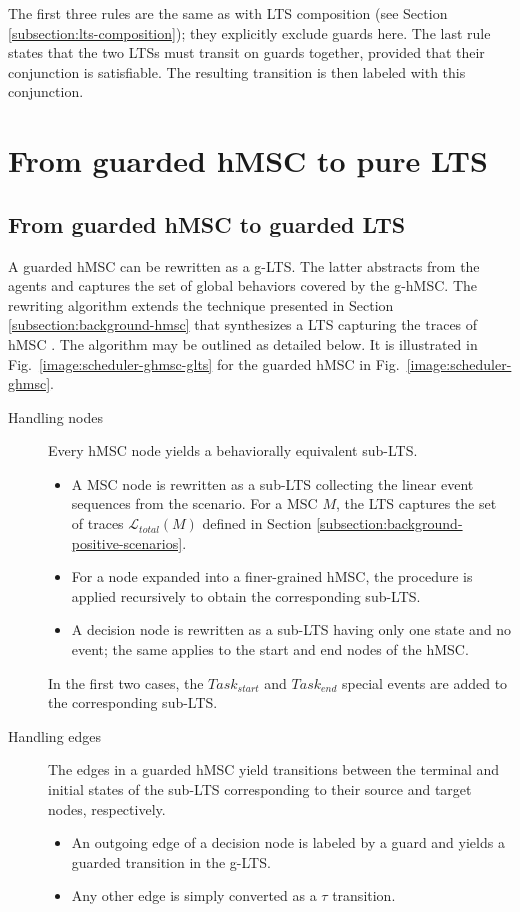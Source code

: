 The first three rules are the same as with LTS composition (see Section \ref{subsection:lts-composition}); they explicitly exclude guards here. The last rule states that the two LTSs must transit on guards together, provided that their conjunction is satisfiable. The resulting transition is then labeled with this conjunction.

\section{From guarded hMSC to pure LTS}

\subsection{From guarded hMSC to guarded LTS}

A guarded hMSC can be rewritten as a g-LTS. The latter abstracts from the agents and captures the set of global behaviors covered by the g-hMSC. The rewriting algorithm extends the technique presented in Section \ref{subsection:background-hmsc} that synthesizes a LTS capturing the traces of hMSC \cite{Uchitel:2004}. The algorithm may
be outlined as detailed below. It is illustrated in Fig.~\ref{image:scheduler-ghmsc-glts} for the guarded hMSC in Fig.~\ref{image:scheduler-ghmsc}.

\begin{description}
\item[Handling nodes] Every hMSC node yields a behaviorally equivalent sub-LTS.
\begin{itemize}
\item A MSC node is rewritten as a sub-LTS collecting the linear event sequences from the scenario. For a MSC $M$, the LTS captures the set of traces $\mathcal{L}_{total}(M)$ defined in Section \ref{subsection:background-positive-scenarios}.
\item For a node expanded into a finer-grained hMSC, the procedure is applied recursively to obtain the corresponding sub-LTS.
\item A decision node is rewritten as a sub-LTS having only one state and no event; the same applies to the start and end nodes of the hMSC.
\end{itemize}
In the first two cases, the $Task_{start}$ and $Task_{end}$ special events are added to the corresponding sub-LTS.
\item[Handling edges] The edges in a guarded hMSC yield transitions between the terminal and initial states of the sub-LTS corresponding to their source and target nodes, respectively.
\begin{itemize}
\item An outgoing edge of a decision node is labeled by a guard and yields a guarded transition in the g-LTS.
\item Any other edge is simply converted as a $\tau$ transition.
\end{itemize}
\end{description}

